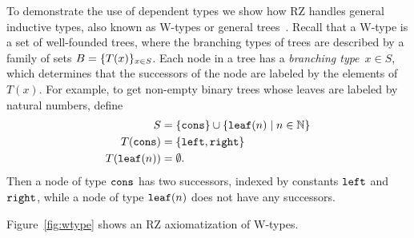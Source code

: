 To demonstrate the use of dependent types we show how RZ handles
general inductive types, also known as W-types or general
trees~\cite{nordstroem90:_progr_martin_type_theor}. Recall that a
W-type is a set of well-founded trees, where the branching types of
trees are described by a family of sets $B = \{T(x)\}_{x \in S}$.
Each node in a tree has a \emph{branching type}~$x \in S$, which
determines that the successors of the node are labeled by the elements
of~$T(x)$.
%
\iflong
%
For example, to get non-empty binary trees whose leaves are
labeled by natural numbers, define
%
\begin{align*}
  S &= \{\mathtt{cons}\} \cup \{\mathtt{leaf}(n) \mid n \in \mathbb{N}\}
  \\
  T(\mathtt{cons}) &= \{\mathtt{left}, \mathtt{right}\}
  \\
  T(\mathtt{leaf}(n)) &= \emptyset.
\end{align*}
%
Then a node of type $\mathtt{cons}$ has two successors, indexed by
constants $\mathtt{left}$ and $\mathtt{right}$, while a node of type
$\mathtt{leaf}(n)$ does not have any successors.
\par
%
\fi %
%
Figure~\ref{fig:wtype} shows an RZ axiomatization of W-types.
%

